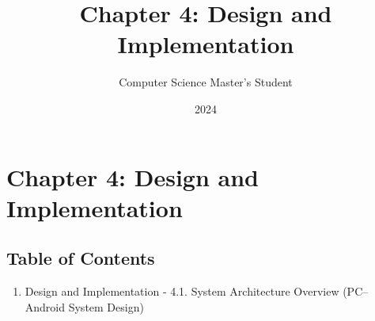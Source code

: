\documentclass[11pt,a4paper]{article}
\title{Chapter 4: Design and Implementation}
\author{Computer Science Master's Student}
\date{2024}
\begin{document}
\maketitle

\section{Chapter 4: Design and Implementation}

\subsection{Table of Contents}

\begin{enumerate}
\item Design and Implementation
    -
    4.1. System Architecture Overview (PC–Android System Design)
\end{enumerate}
\end{document}
